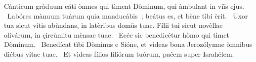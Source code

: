 { Cànticum gràduum}
{%
eáti òmnes qui tìment Dòminum, qui àmbulant in viïs ejus. 
~Labóres mànuum tuárum quia manducábis~; beátus es, et bène tìbi èrit. 
~Uxor tua sicut vitis abùndans, in latèribus domüs tuae. Fílii tui sicut novèllae olivárum, in çircùmitu mènsae tuae. 
~Ecċe sic benedicétur hòmo qui tìmet Dòminum. 
~Benedícat tìbi Dòminus e Sióne, et vìdeas bona Jerozólymae òmnibus diébus vitae tuae. 
~Et vìdeas fílios filiórum tuórum, paċem super Israhélem. 
}
